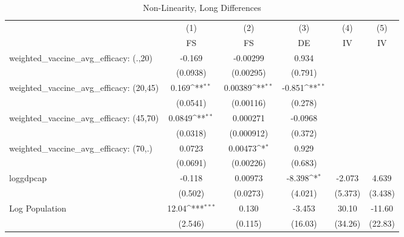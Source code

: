 \begin{table}[htbp]\centering
\def\sym#1{\ifmmode^{#1}\else\(^{#1}\)\fi}
\caption{Non-Linearity, Long Differences}
\begin{tabular}{l*{5}{c}}
\toprule
                &\multicolumn{1}{c}{(1)}&\multicolumn{1}{c}{(2)}&\multicolumn{1}{c}{(3)}&\multicolumn{1}{c}{(4)}&\multicolumn{1}{c}{(5)}\\
                &\multicolumn{1}{c}{FS}&\multicolumn{1}{c}{FS}&\multicolumn{1}{c}{DE}&\multicolumn{1}{c}{IV}&\multicolumn{1}{c}{IV}\\
\midrule
weighted\_vaccine\_avg\_efficacy: (.,20)&   -0.169         & -0.00299         &    0.934         &                  &                  \\
                & (0.0938)         &(0.00295)         &  (0.791)         &                  &                  \\
\addlinespace
weighted\_vaccine\_avg\_efficacy: (20,45)&    0.169\sym{**} &  0.00389\sym{**} &   -0.851\sym{**} &                  &                  \\
                & (0.0541)         &(0.00116)         &  (0.278)         &                  &                  \\
\addlinespace
weighted\_vaccine\_avg\_efficacy: (45,70)&   0.0849\sym{**} & 0.000271         &  -0.0968         &                  &                  \\
                & (0.0318)         &(0.000912)         &  (0.372)         &                  &                  \\
\addlinespace
weighted\_vaccine\_avg\_efficacy: (70,.)&   0.0723         &  0.00473\sym{*}  &    0.929         &                  &                  \\
                & (0.0691)         &(0.00226)         &  (0.683)         &                  &                  \\
\addlinespace
loggdpcap       &   -0.118         &  0.00973         &   -8.398\sym{*}  &   -2.073         &    4.639         \\
                &  (0.502)         & (0.0273)         &  (4.021)         &  (5.373)         &  (3.438)         \\
\addlinespace
Log Population  &    12.04\sym{***}&    0.130         &   -3.453         &    30.10         &   -11.60         \\
                &  (2.546)         &  (0.115)         &  (16.03)         &  (34.26)         &  (22.83)         \\

\end{tabular}
\end{table}
